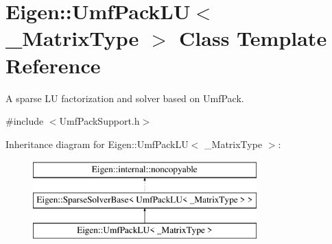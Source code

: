 \hypertarget{class_eigen_1_1_umf_pack_l_u}{}\section{Eigen\+::Umf\+Pack\+LU$<$ \+\_\+\+Matrix\+Type $>$ Class Template Reference}
\label{class_eigen_1_1_umf_pack_l_u}


A sparse LU factorization and solver based on Umf\+Pack.  




{\ttfamily \#include $<$Umf\+Pack\+Support.\+h$>$}

Inheritance diagram for Eigen\+::Umf\+Pack\+LU$<$ \+\_\+\+Matrix\+Type $>$\+:\begin{figure}[H]
\begin{center}
\leavevmode
\includegraphics[height=3.000000cm]{class_eigen_1_1_umf_pack_l_u}
\end{center}
\end{figure}
